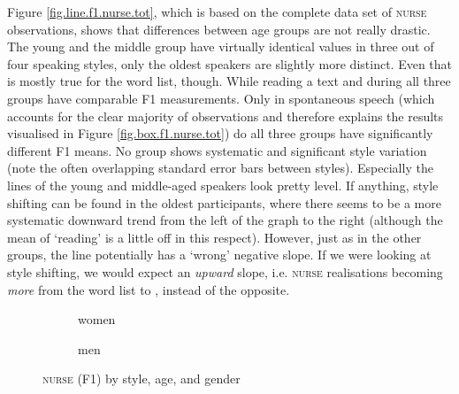 Figure \ref{fig.line.f1.nurse.tot}, which is based on the complete data set of \textsc{nurse} observations, shows that differences between age groups are not really drastic.
The young and the middle group have virtually identical values in three out of four speaking styles, only the oldest speakers are slightly more distinct.
Even that is mostly true for the word list, though.
While reading a text and during  all three groups have comparable F1 measurements.
Only in spontaneous speech (which accounts for the clear majority of observations and therefore explains the results visualised in Figure \ref{fig.box.f1.nurse.tot}) do all three groups have significantly different F1 means.
No group shows systematic and significant style variation (note the often overlapping standard error bars between styles).
Especially the lines of the young and middle-aged speakers look pretty level.
If anything, style shifting can be found in the oldest participants, where there seems to be a more systematic downward trend from the left of the graph to the right (although the mean of `reading' is a little off in this respect).
However, just as in the other groups, the line potentially has a `wrong' negative slope.
If we were looking at  style shifting, we would expect an \emph{upward} slope, i.e. \textsc{nurse} realisations becoming \emph{more}  from the word list to , instead of the opposite.

\begin{figure}[h!]
	\centering
	\begin{subfigure}{.49\textwidth}
		\centering
			\resizebox{\linewidth}{!}{} 
		\caption{women}
		\label{fig.line.f1.nurse.women}
	\end{subfigure}
	\begin{subfigure}{.49\textwidth}
		\centering
			\resizebox{\linewidth}{!}{} 
		\caption{men}
		\label{fig.line.f1.nurse.men}
	\end{subfigure}
	\caption{\textsc{nurse} (F1) by style, age, and gender}
\end{figure}

